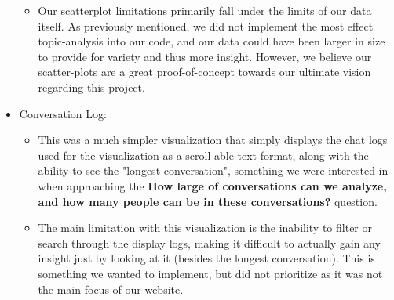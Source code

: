 \documentclass{article}\usepackage{graphicx}
\begin{document}
\begin{itemize}
\begin{itemize}
        \item Our scatterplot limitations primarily fall under the limits of our data itself. As previously mentioned, we did not implement the most effect topic-analysis into our code, and our data could have been larger in size to provide for variety and thus more insight. However, we believe our scatter-plots are a great proof-of-concept towards our ultimate vision regarding this project.
    \end{itemize}
    \item Conversation Log:
    \begin{itemize}
        \item This was a much simpler visualization that simply displays the chat logs used for the visualization as a scroll-able text format, along with the ability to see the "longest conversation", something we were interested in when approaching the \textbf{How large of conversations can we analyze, and how many people can be in these conversations?} question. 
        \item The main limitation with this visualization is the inability to filter or search through the display logs, making it difficult to actually gain any insight just by looking at it (besides the longest conversation). This is something we wanted to implement, but did not prioritize as it was not the main focus of our website.
    \end{itemize}
\end{itemize}
\end{document}
